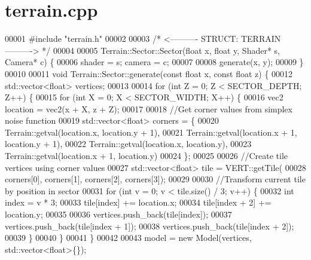 \section{terrain.\+cpp}
\label{terrain_8cpp_source}

\begin{DoxyCode}
00001 \textcolor{preprocessor}{#include "terrain.h"}
00002 
00003 \textcolor{comment}{/* <---------- STRUCT: TERRAIN ----------> */}
00004 
00005 Terrain::Sector::Sector(\textcolor{keywordtype}{float} x, \textcolor{keywordtype}{float} y, Shader* s, Camera* c) \{
00006     shader = s; camera = c;
00007 
00008     generate(x, y);
00009 \}
00010 
00011 \textcolor{keywordtype}{void} Terrain::Sector::generate(\textcolor{keyword}{const} \textcolor{keywordtype}{float} x, \textcolor{keyword}{const} \textcolor{keywordtype}{float} z) \{
00012     std::vector<float> vertices;
00013 
00014     \textcolor{keywordflow}{for} (\textcolor{keywordtype}{int} Z = 0; Z < SECTOR\_DEPTH; Z++) \{
00015         \textcolor{keywordflow}{for} (\textcolor{keywordtype}{int} X = 0; X < SECTOR\_WIDTH; X++) \{
00016             vec2 location = vec2(x + X, z + Z);
00017 
00018             \textcolor{comment}{//Get corner values from simplex noise function}
00019             std::vector<float> corners = \{
00020                 Terrain::getval(location.x,     location.y + 1), 
00021                 Terrain::getval(location.x + 1, location.y + 1),
00022                 Terrain::getval(location.x,     location.y), 
00023                 Terrain::getval(location.x + 1, location.y)
00024             \};
00025 
00026             \textcolor{comment}{//Create tile vertices using corner values}
00027             std::vector<float> tile = VERT::getTile(
00028                 corners[0], corners[1], corners[2], corners[3]);
00029 
00030             \textcolor{comment}{//Transform current tile by position in sector}
00031             \textcolor{keywordflow}{for} (\textcolor{keywordtype}{int} v = 0; v < tile.size() / 3; v++) \{
00032                 \textcolor{keywordtype}{int} index        = v * 3;
00033                 tile[index]     += location.x;
00034                 tile[index + 2] += location.y;
00035 
00036                 vertices.push\_back(tile[index]);
00037                 vertices.push\_back(tile[index + 1]);
00038                 vertices.push\_back(tile[index + 2]);
00039             \}
00040         \}
00041     \}
00042 
00043     model = \textcolor{keyword}{new} Model(vertices, std::vector<float>\{\});

\end{DoxyCode}
